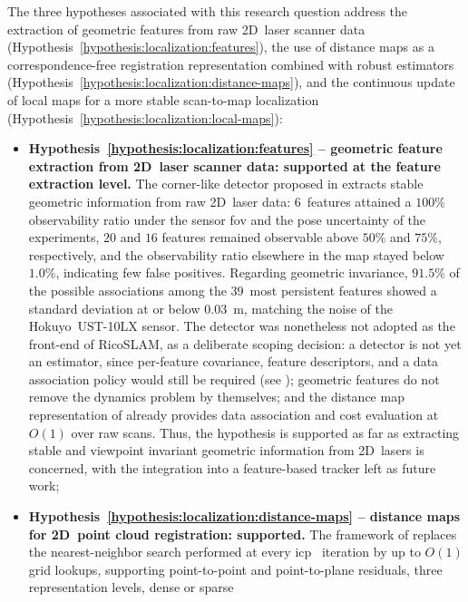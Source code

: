The three hypotheses associated with this research question address the
extraction of geometric features from raw 2D~laser scanner data
(Hypothesis~\ref{hypothesis:localization:features}), the use of distance maps
as a correspondence-free registration representation combined with robust
estimators (Hypothesis~\ref{hypothesis:localization:distance-maps}), and the
continuous update of local maps for a more stable scan-to-map localization
(Hypothesis~\ref{hypothesis:localization:local-maps}):
\begin{itemize}
\item \textbf{Hypothesis~\ref{hypothesis:localization:features} --
geometric feature extraction from 2D~laser scanner data: supported at the
feature extraction level.}
The corner-like detector proposed in  extracts stable
geometric information from raw 2D~laser data: $6$~features attained a
$100\%$ observability ratio under the sensor \gls{fov} and the pose
uncertainty of the experiments, $20$ and $16$ features remained observable
above $50\%$ and $75\%$, respectively, and the observability ratio elsewhere
in the map stayed below $1.0\%$, indicating few false positives.
Regarding geometric invariance, $91.5\%$ of the possible associations among
the $39$~most persistent features showed a standard deviation at or below
\SI{0.03}{\metre}, matching the noise of the Hokuyo~UST-10LX sensor.
The detector was nonetheless not adopted as the front-end of RicoSLAM, as a
deliberate scoping decision: a detector is not yet an estimator, since
per-feature covariance, feature descriptors, and a data association policy
would still be required (see ); geometric
features do not remove the dynamics problem by themselves; and the distance
map representation of  already provides data
association and cost evaluation at $O(1)$ over raw scans.
Thus, the hypothesis is supported as far as extracting stable and viewpoint
invariant geometric information from 2D~lasers is concerned, with the
integration into a feature-based tracker left as future work;
\item \textbf{Hypothesis~\ref{hypothesis:localization:distance-maps} --
distance maps for 2D~point cloud registration: supported.}
The framework of  replaces the nearest-neighbor
search performed at every \gls{icp}~\cite{besl-mckay:tpami:1992,chen-medioni:icra:1991}
iteration by up to $O(1)$ grid lookups, supporting point-to-point and
point-to-plane residuals, three representation levels, dense or sparse

\end{itemize}
